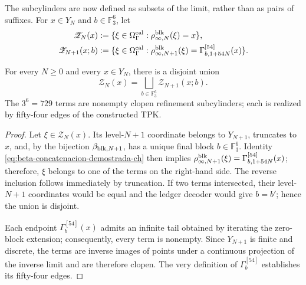 

The subcylinders are now defined as subsets of the limit, rather than as pairs
of suffixes. For \(x\in Y_N\) and \(b\in\mathbb F_3^6\), let
\begin{align}
 \mathscr Z_N(x)
   &:=\{\xi\in\Omega_\Gamma^{\rm cal}:
       \rho^{\rm blk}_{\infty,N}(\xi)=x\},
 \label{eq:cilindro-real-limite-ch}\\
 \mathscr Z_{N+1}(x;b)
   &:=\{\xi\in\Omega_\Gamma^{\rm cal}:
       \rho^{\rm blk}_{\infty,N+1}(\xi)
       =\Gamma_{b,1+54N}^{[54]}(x)\}.
 \label{eq:subcilindro-real-limite-ch}
\end{align}

\begin{theorem}
\label{thm:particion-729-subcilindros-ch}
For every \(N\ge0\) and every \(x\in Y_N\), there is a disjoint union
\begin{equation}
 \mathscr Z_N(x)=
 \bigsqcup_{b\in\mathbb F_3^6}\mathscr Z_{N+1}(x;b).
 \label{eq:particion-real-729-ch}
\end{equation}
The \(3^6=729\) terms are nonempty clopen refinement subcylinders; each is
realized by fifty-four edges of the constructed TPK.
\end{theorem}

\begin{proof}
Let \(\xi\in\mathscr Z_N(x)\). Its level-\(N+1\) coordinate belongs to
\(Y_{N+1}\), truncates to \(x\), and, by the bijection
\(\beta_{{\rm blk},N+1}\), has a unique final block
\(b\in\mathbb F_3^6\). Identity
\eqref{eq:beta-concatenacion-demostrada-ch} then implies
\(\rho^{\rm blk}_{\infty,N+1}(\xi)
=\Gamma_{b,1+54N}^{[54]}(x)\); therefore, \(\xi\) belongs to one of the terms
on the right-hand side. The reverse inclusion follows immediately by
truncation. If two terms intersected, their level-\(N+1\) coordinates would
be equal and the ledger decoder would give \(b=b'\); hence the union is
disjoint.

Each endpoint \(\Gamma_b^{[54]}(x)\) admits an infinite tail obtained by
iterating the zero-block extension; consequently, every term is nonempty.
Since \(Y_{N+1}\) is finite and discrete, the terms are inverse images of
points under a continuous projection of the inverse limit and are therefore
clopen. The very definition of \(\Gamma_b^{[54]}\) establishes its
fifty-four edges.
\end{proof}

